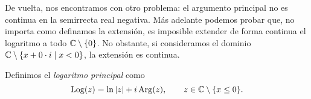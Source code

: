 De vuelta, nos encontramos con otro problema: el argumento principal no es continua en la semirrecta real negativa. Más adelante podemos probar que, no importa como definamos la extensión, es imposible extender de forma continua el logaritmo a todo $\mathbb{C} \setminus \{0\}$. No obstante, si consideramos el dominio $\mathbb{C} \setminus \{ x + 0 \cdot i  \mid x < 0\}$, la extensión es continua.

\begin{definition}
    Definimos el \emph{logaritmo principal} como
    \begin{equation*}
        \operatorname{Log}(z) = \ln|z| + i \operatorname{Arg}(z), \qquad z \in \mathbb{C} \setminus \{x \leq 0\}.
    \end{equation*}
\end{definition}